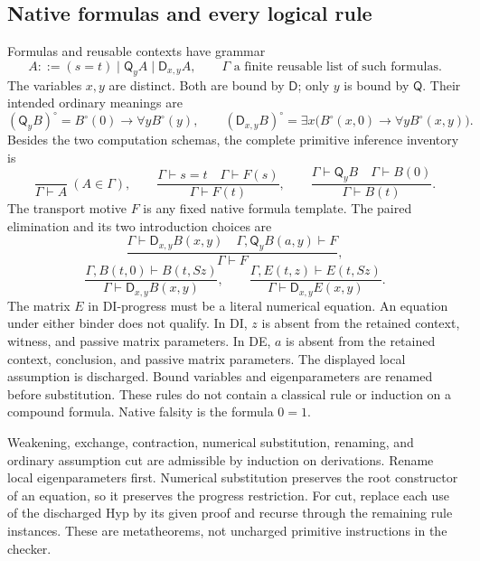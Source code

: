 \documentclass[11pt,letterpaper]{article}
\theoremstyle{definition}\newtheorem{definition}[theorem]{Definition}
\theoremstyle{remark}\newtheorem{remark}[theorem]{Remark}
\newcommand{\D}{\mathsf D}
\newcommand{\Q}{\mathsf Q}
\begin{document}
\subsection{Native formulas and every logical rule}
Formulas and reusable contexts have grammar
\[
 A::=(s=t)\mid\Q_y A\mid\D_{x,y}A,\qquad
 \Gamma\text{ a finite reusable list of such formulas}.
\]
The variables $x,y$ are distinct. Both are bound by $\D$; only $y$ is
bound by $\Q$. Their intended ordinary meanings are
\[
 (\Q_yB)^\circ=B^\circ(0)\to\forall yB^\circ(y),
 \qquad
 (\D_{x,y}B)^\circ=
 \exists x\bigl(B^\circ(x,0)\to\forall yB^\circ(x,y)\bigr).
\]
Besides the two computation schemas, the complete primitive inference
inventory is
\[
 \frac{}{\Gamma\vdash A}\ (A\in\Gamma),\qquad
 \frac{\Gamma\vdash s=t\quad\Gamma\vdash F(s)}
      {\Gamma\vdash F(t)},\qquad
 \frac{\Gamma\vdash\Q_yB\quad\Gamma\vdash B(0)}
      {\Gamma\vdash B(t)}.
 \tag{Hyp, Tr, QE}
\]
The transport motive $F$ is any fixed native formula template. The paired
elimination and its two introduction choices are
\[
 \frac{\Gamma\vdash\D_{x,y}B(x,y)\quad
       \Gamma,\Q_yB(a,y)\vdash F}{\Gamma\vdash F},
 \tag{DE}
\]
\[
 \frac{\Gamma,B(t,0)\vdash B(t,Sz)}{\Gamma\vdash\D_{x,y}B(x,y)},
 \qquad
 \frac{\Gamma,E(t,z)\vdash E(t,Sz)}{\Gamma\vdash\D_{x,y}E(x,y)}.
 \tag{DI-case, DI-progress}
\]
The matrix $E$ in DI-progress must be a literal numerical equation.
An equation under either binder does not qualify. In DI, $z$ is absent
from the retained context, witness, and passive matrix parameters.
In DE, $a$ is absent from the retained context, conclusion, and passive
matrix parameters. The displayed local assumption is discharged.
Bound variables and eigenparameters are renamed before substitution.
These rules do not contain a classical rule or induction on a compound
formula. Native falsity is the formula $0=1$.

Weakening, exchange, contraction, numerical substitution, renaming, and
ordinary assumption cut are admissible by induction on derivations.
Rename local eigenparameters first. Numerical substitution preserves the
root constructor of an equation, so it preserves the progress restriction.
For cut, replace each use of the discharged Hyp by its given proof and
recurse through the remaining rule instances. These are metatheorems,
not uncharged primitive instructions in the checker.
\end{document}
